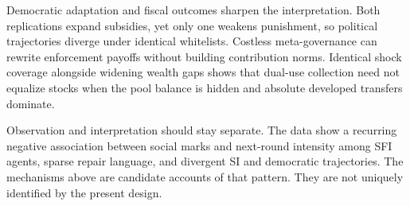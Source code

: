 Democratic adaptation and fiscal outcomes sharpen the interpretation.
Both replications expand subsidies, yet only one weakens punishment, so political trajectories diverge under identical whitelists.
Costless meta-governance can rewrite enforcement payoffs without building contribution norms.
Identical shock coverage alongside widening wealth gaps shows that dual-use collection need not equalize stocks when the pool balance is hidden and absolute developed transfers dominate.

Observation and interpretation should stay separate.
The data show a recurring negative association between social marks and next-round intensity among SFI agents, sparse repair language, and divergent SI and democratic trajectories.
The mechanisms above are candidate accounts of that pattern.
They are not uniquely identified by the present design.
